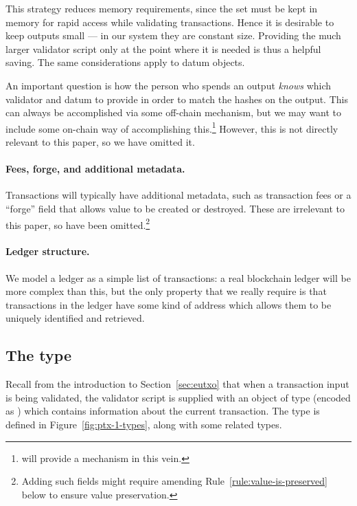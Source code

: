 This strategy reduces memory requirements, since
the \UTXO{} set must be kept in memory for rapid access while validating
transactions. Hence it is desirable to keep outputs small --- in
our system they are constant size.
Providing the much larger validator script only at the point where it is needed
is thus a helpful saving. The same considerations apply to datum objects.

An important question is how the person who spends an output \emph{knows} which
validator and datum to provide in order to match the hashes on the output.
This can always be accomplished via some off-chain mechanism, but we may
want to include some on-chain way of accomplishing this.\footnote{\Cardano{} will provide
a mechanism in this vein.} However, this is not directly relevant to this paper,
so we have omitted it.

\paragraph{Fees, forge, and additional metadata.}  Transactions will typically
have additional metadata, such as transaction fees or a ``forge''
field that allows value to be created or destroyed. These are
irrelevant to this paper, so have been omitted.\footnote{ Adding such
  fields might require amending Rule~\ref{rule:value-is-preserved}
  below to ensure value preservation.  }

\paragraph{Ledger structure.} We model a ledger as a simple
list of transactions: a real blockchain ledger will be more complex
than this, but the only property that we really require is that
transactions in the ledger have some kind of address which allows them
to be uniquely identified and retrieved.

\subsection{The \ctx{} type}
\label{sec:validation-context}
Recall from the introduction to Section~\ref{sec:eutxo} that when a
transaction input is being validated, the validator script is supplied
with an object of type \ctx{} (encoded as \Data{}) which contains
information about the current transaction.  The \ctx{} type is defined
in Figure~\ref{fig:ptx-1-types}, along with some related types.

